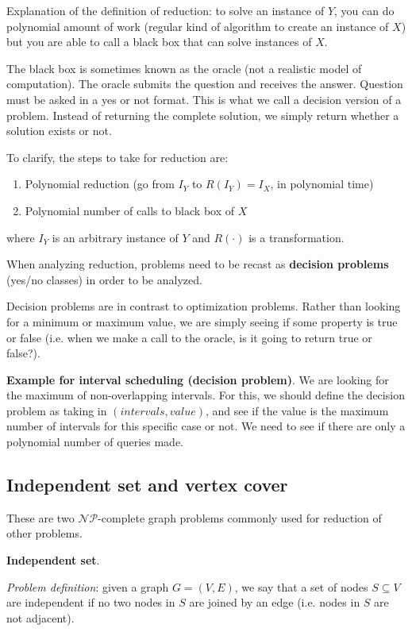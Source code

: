 \documentclass{article}
\begin{document}
Explanation of the definition of reduction: to solve an instance of $Y$, you can do polynomial amount of work (regular kind of algorithm to create an instance of $X$) but you are able to call a black box that can solve instances of $X$.

The black box is sometimes known as the oracle (not a realistic model of computation). The oracle submits the question and receives the answer. Question must be asked in a yes or not format. This is what we call a decision version of a problem. Instead of returning the complete solution, we simply return whether a solution exists or not.

To clarify, the steps to take for reduction are:
\begin{enumerate}
    \item Polynomial reduction (go from $I_Y$ to $R(I_Y) = I_X$, in polynomial time)
    \item Polynomial number of calls to black box of $X$
\end{enumerate}

where $I_Y$ is an arbitrary instance of $Y$ and $R(\cdot)$ is a transformation.

When analyzing reduction, problems need to be recast as \textbf{decision problems} (yes/no classes) in order to be analyzed.

Decision problems are in contrast to optimization problems. Rather than looking for a minimum or maximum value, we are simply seeing if some property is true or false (i.e. when we make a call to the oracle, is it going to return true or false?).

\textbf{Example for interval scheduling (decision problem)}. We are looking for the maximum of non-overlapping intervals. For this, we should define the decision problem as taking in $(intervals, value)$, and see if the value is the maximum number of intervals for this specific case or not. We need to see if there are only a polynomial number of queries made.

\subsection{Independent set and vertex cover}
These are two $\mathcal{NP}$-complete graph problems commonly used for reduction of other problems.

\textbf{Independent set}.

\textit{Problem definition}: given a graph $G = (V, E)$, we say that a set of nodes $S \subseteq V$ are independent if no two nodes in $S$ are joined by an edge (i.e. nodes in $S$ are not adjacent).
\end{document}
